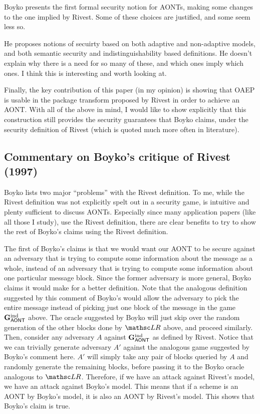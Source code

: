 \documentclass[11pt,twoside]{article}
\begin{document}
Boyko presents the first formal security notion for AONTs, making some changes to the one implied by Rivest. Some of these choices are justified, and some seem less so. 

He proposes notions of secuirty based on both adaptive and non-adaptive models, and both semantic security and indistinguishability based definitions. He doesn't explain why there is a need for so many of these, and which ones imply which ones. I think this is interesting and worth looking at. 

Finally, the key contribution of this paper (in my opinion) is showing that OAEP is usable in the package transform proposed by Rivest in order to achieve an AONT. With all of the above in mind, I would like to show explicitly that this construction still provides the security guarantees that Boyko claims, under the security definition of Rivest (which is quoted much more often in literature). 

\subsection{Commentary on Boyko's critique of Rivest (1997)}

Boyko lists two major ``problems'' with the Rivest definition. To me, while the Rivest definition was not explicitly spelt out in a security game, is intuitive and plenty sufficient to discuss AONTs. Especially since many application papers (like all those I study), use the Rivest definition, there are clear benefits to try to show the rest of Boyko's claims using the Rivest definition. 

The first of Boyko's claims is that we would want our AONT to be secure against an adversary that is trying to compute some information about the message as a whole, instead of an adversary that is trying to compute some information about one particular message block. Since the former adversary is more general, Boyko claims it would make for a better definition. Note that the analogous definition suggested by this comment of Boyko's would allow the adversary to pick the entire message instead of picking just one block of the message in the game $\mathbf{G}_{\mathsf{AONT}}^\text{ind}$ above. The oracle suggested by Boyko will just skip over the random generation of the other blocks done by $\LRO$ above, and proceed similarly. Then, consider any adversary $A$ against $\mathbf{G}_{\mathsf{AONT}}^\text{ind}$ as defined by Rivest. Notice that we can trivially generate adversary $A'$ against the analogous game suggested by Boyko's comment here. $A'$ will simply take any pair of blocks queried by $A$ and randomly generate the remaining blocks, before passing it to the Boyko oracle analogous to $\LRO$. Therefore, if we have an attack against Rivest's model, we have an attack against Boyko's model. This means that if a scheme is an AONT by Boyko's model, it is also an AONT by Rivest's model. This shows that Boyko's claim is true. 
\end{document}
